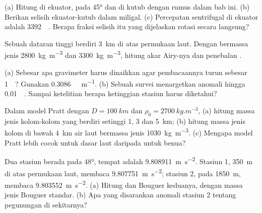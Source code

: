 \begin{exercise}[$\star$]\label{exo:b1:isostasy-gravity:2}
(a) Hitung  di ekuator, pada \ang{45} dan di kutub dengan rumus dalam bab ini. (b) Berikan selisih ekuator-kutub dalam miligal. (c) Percepatan sentrifugal di ekuator adalah \qty{3392}{\milli\gal}. Berapa fraksi selisih itu yang dijelaskan rotasi secara langsung?
\end{exercise}

\begin{exercise}[$\star$]\label{exo:b1:isostasy-gravity:3}
Sebuah dataran tinggi berdiri \qty{3}{km} di atas permukaan laut. Dengan  bermassa jenis \qty{2800}{kg.m^{-3}} dan  \qty{3300}{kg.m^{-3}}, hitung akar Airy-nya dan penebalan .
\end{exercise}

\begin{exercise}[$\star$]\label{exo:b1:isostasy-gravity:4}
(a) Sebesar apa gravimeter harus dinaikkan agar pembacaannya turun sebesar \qty{1}{\milli\gal}? Gunakan \qty{0.3086}{\milli\gal.m^{-1}}. (b) Sebuah survei menargetkan anomali hingga \qty{0.01}{\milli\gal}. Sampai ketelitian berapa ketinggian stasiun harus diketahui?
\end{exercise}

\begin{exercise}[$\star\star$]\label{exo:b1:isostasy-gravity:5}
Dalam model Pratt dengan $D = \qty{100}{km}$ dan $\rho_0 = \qty{2700}{kg.m^{-3}}$, (a) hitung massa jenis kolom-kolom yang berdiri setinggi 1, 3 dan \qty{5}{km}; (b) hitung massa jenis kolom di bawah \qty{4}{km} air laut bermassa jenis \qty{1030}{kg.m^{-3}}. (c) Mengapa model Pratt lebih cocok untuk dasar laut daripada untuk benua?
\end{exercise}

\begin{exercise}[$\star\star$]\label{exo:b1:isostasy-gravity:6}
Dua stasiun berada pada  \ang{48}, tempat  adalah \qty{9.808911}{m.s^{-2}}. Stasiun 1, \qty{350}{m} di atas permukaan laut, membaca \qty{9.807751}{m.s^{-2}}; stasiun 2, pada \qty{1850}{m}, membaca \qty{9.803552}{m.s^{-2}}. (a) Hitung  dan Bouguer keduanya, dengan massa jenis Bouguer standar. (b) Apa yang disarankan anomali stasiun 2 tentang pegunungan di sekitarnya?
\end{exercise}

